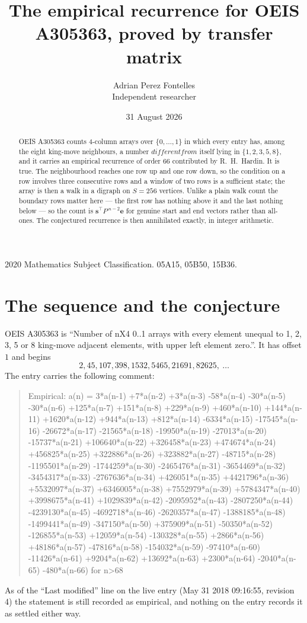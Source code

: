 \documentclass[11pt,a4paper]{article}
\title{The empirical recurrence for OEIS A305363, proved by transfer matrix}
\author{Adrian Perez Fontelles\\ \small Independent researcher}
\date{31 August 2026}
\theoremstyle{plain}
\theoremstyle{definition}
\begin{document}
\maketitle

\begin{abstract}
OEIS A305363 counts $4$-column arrays over $\{0,\dots,1\}$ in which every entry has,
among the eight king-move neighbours, a number $different from$ itself lying in $\{1,2,3,5,8\}$, and it carries an empirical
recurrence of order $66$ contributed by R.~H.~Hardin. It is true. The neighbourhood
reaches one row up and one row down, so the condition on a row involves three consecutive
rows and a window of two rows is a sufficient state; the array is then a walk in a digraph
on $S=256$ vertices. Unlike a plain walk count the boundary rows matter here --- the first
row has nothing above it and the last nothing below --- so the count is
$\mathbf{s}^{\!\top}P^{\,n-2}\mathbf{e}$ for genuine start and end vectors rather than
all-ones. The conjectured recurrence is then annihilated exactly, in integer arithmetic.
\end{abstract}

\noindent\small 2020 Mathematics Subject Classification. 05A15, 05B50, 15B36.\normalsize

\section{The sequence and the conjecture}

OEIS A305363 is ``Number of nX4 0..1 arrays with every element unequal to 1, 2, 3, 5 or 8 king-move adjacent elements, with upper left element zero.''. It has offset
$1$ and begins
\[
2, 45, 107, 398, 1532, 5465, 21691, 82625,\ \dots
\]
The entry carries the following comment:
\begin{quote}\small
Empirical: a(n) = 3*a(n-1) +7*a(n-2) +3*a(n-3) -58*a(n-4) -30*a(n-5) -30*a(n-6) +125*a(n-7) +151*a(n-8) +229*a(n-9) +460*a(n-10) +144*a(n-11) +1620*a(n-12) +944*a(n-13) +812*a(n-14) -6334*a(n-15) -17545*a(n-16) -26672*a(n-17) -21565*a(n-18) -19950*a(n-19) -27013*a(n-20) -15737*a(n-21) +106640*a(n-22) +326458*a(n-23) +474674*a(n-24) +456825*a(n-25) +322886*a(n-26) +323882*a(n-27) -48715*a(n-28) -1195501*a(n-29) -1744259*a(n-30) -2465476*a(n-31) -3654469*a(n-32) -3454317*a(n-33) -2767636*a(n-34) +426051*a(n-35) +4421796*a(n-36) +5532097*a(n-37) +6346005*a(n-38) +7552979*a(n-39) +5784347*a(n-40) +3998675*a(n-41) +1029839*a(n-42) -2095952*a(n-43) -2807250*a(n-44) -4239130*a(n-45) -4692718*a(n-46) -2620357*a(n-47) -1388185*a(n-48) -1499441*a(n-49) -347150*a(n-50) +375909*a(n-51) -50350*a(n-52) -126855*a(n-53) +12059*a(n-54) -130328*a(n-55) +2866*a(n-56) +48186*a(n-57) -47816*a(n-58) -154032*a(n-59) -97410*a(n-60) -11426*a(n-61) +9204*a(n-62) +13692*a(n-63) +2300*a(n-64) -2040*a(n-65) -480*a(n-66) for n>68
\end{quote}
As of the ``Last modified'' line on the live entry (May 31 2018 09:16:55, revision
4) the statement is still recorded as empirical, and nothing on the entry
records it as settled either way.
\end{document}
